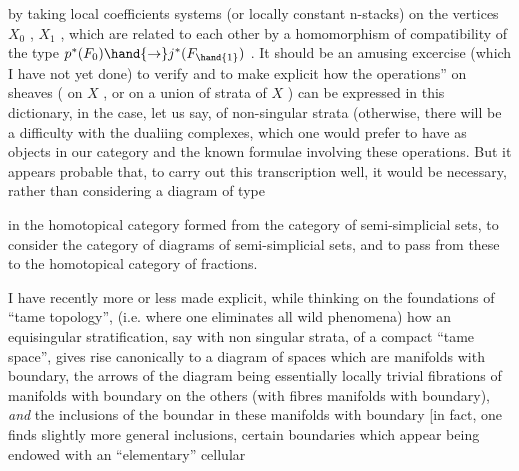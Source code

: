

by taking local coefficients systems (or locally constant n-stacks) on
the vertices $X_0$ , $X_1$ , which are related to each other by a homomorphism
of compatibility of the type $p^*(F_0)\hand{\to} j^*(F_{\hand{1}})$ . It should be an amusing
excercise (which I have not yet done) to verify and to make explicit how
the   operations'' on sheaves ( on $X$ , or on a  union of strata of $X$ )
can be expressed in this dictionary, in the case, let us say, of non-singular
strata (otherwise, there will be a difficulty with the dualiing complexes,
which one would prefer to have as objects in our category\hand{)}\hand{,} and  
 the known formulae involving these operations\deleted{)}. But it appears
probable that, to carry out this transcription well, it would be necessary,
rather than considering a diagram of type

\diagram{\begin{tikzcd}
\bullet \arrow[r,color=blue] \arrow[d,color=blue] & \bullet \\
\bullet &
\end{tikzcd}}

in the homotopical category formed from the category of semi-simplicial sets,
to consider the category of diagrams of semi-simplicial sets, and to pass from
these to the homotopical category of fractions.

I have recently more or less made explicit, while thinking on the
foundations of ``tame topology'', (i.e. where one  eliminates  all
wild phenomena) how an equisingular stratification, say with non singular
strata, of a compact ``tame space'', gives rise canonically to a diagram of spaces
which are manifolds with boundary,  the arrows of the diagram being essentially
locally trivial fibrations of manifolds with boundary on the others (with
fibres  manifolds with boundary), \textit{and} the inclusions of the boundar in these
manifolds with boundary [in fact, one finds slightly more general inclusions,
certain boundaries which appear being endowed with an ``elementary'' cellular

